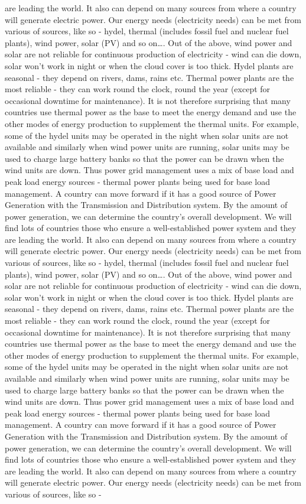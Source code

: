 \documentclass[10pt, a4paper]{article}
\begin{document}
are leading the world. It also can depend on many sources from where a country will generate electric power. Our energy needs (electricity needs) can be met from various of sources, like so - hydel, thermal (includes fossil fuel and nuclear fuel plants), wind power, solar (PV) and so on\dots. Out of the above, wind power and solar are not reliable for continuous production of electricity - wind can die down, solar won’t work in night or when the cloud cover is too thick. Hydel plants are seasonal - they depend on rivers, dams, rains etc. Thermal power plants are the most reliable - they can work round the clock, round the year (except for occasional downtime for maintenance). It is not therefore surprising that many countries use thermal power as the base to meet the energy demand and use the other modes of energy production to supplement the thermal units. For example, some of the hydel units may be operated in the night when solar units are not available and similarly when wind power units are running, solar units may be used to charge large battery banks so that the power can be drawn when the wind units are down. Thus power grid management uses a mix of base load and peak load energy sources - thermal power plants being used for base load management. A country can move forward if it has a good source of Power Generation with the Transmission and Distribution system. By the amount of power generation, we can determine the country’s overall development. We will find lots of countries those who ensure a well-established power system and they are leading the world. It also can depend on many sources from where a country will generate electric power. Our energy needs (electricity needs) can be met from various of sources, like so - hydel, thermal (includes fossil fuel and nuclear fuel plants), wind power, solar (PV) and so on\dots. Out of the above, wind power and solar are not reliable for continuous production of electricity - wind can die down, solar won’t work in night or when the cloud cover is too thick. Hydel plants are seasonal - they depend on rivers, dams, rains etc. Thermal power plants are the most reliable - they can work round the clock, round the year (except for occasional downtime for maintenance). It is not therefore surprising that many countries use thermal power as the base to meet the energy demand and use the other modes of energy production to supplement the thermal units. For example, some of the hydel units may be operated in the night when solar units are not available and similarly when wind power units are running, solar units may be used to charge large battery banks so that the power can be drawn when the wind units are down. Thus power grid management uses a mix of base load and peak load energy sources - thermal power plants being used for base load management. A country can move forward if it has a good source of Power Generation with the Transmission and Distribution system. By the amount of power generation, we can determine the country’s overall development. We will find lots of countries those who ensure a well-established power system and they are leading the world. It also can depend on many sources from where a country will generate electric power. Our energy needs (electricity needs) can be met from various of sources, like so - 
\end{document}
